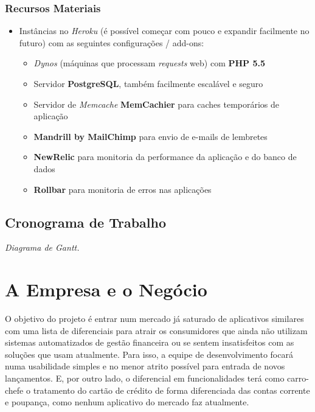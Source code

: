 \documentclass[a4paper]{abnt}
\begin{document}
\subsection*{Recursos Materiais}
\begin{itemize}
	\item Instâncias no \emph{Heroku} (é possível começar com pouco e expandir facilmente no futuro\cite{heroku}) com as seguintes configurações / add-ons:
	\begin{itemize}
		\item \emph{Dynos} (máquinas que processam \emph{requests} web) com \textbf{PHP 5.5}
		\item Servidor \textbf{PostgreSQL}, também facilmente escalável e seguro\cite{heroku-pgsql}
		\item Servidor de \emph{Memcache} \textbf{MemCachier} para caches temporários de aplicação
		\item \textbf{Mandrill by MailChimp} para envio de e-mails de lembretes
		\item \textbf{NewRelic} para monitoria da performance da aplicação e do banco de dados
		\item \textbf{Rollbar} para monitoria de erros nas aplicações
	\end{itemize}
\end{itemize}

\section{Cronograma de Trabalho}
\emph{Diagrama de Gantt.}

\chapter{A Empresa e o Negócio}
O objetivo do projeto é entrar num mercado já saturado de aplicativos similares com uma lista de diferenciais para atrair os consumidores que ainda não utilizam sistemas automatizados de gestão financeira ou se sentem insatisfeitos com as soluções que usam atualmente. Para isso, a equipe de desenvolvimento focará numa usabilidade simples e no menor atrito possível para entrada de novos lançamentos. E, por outro lado, o diferencial em funcionalidades terá como carro-chefe o tratamento do cartão de crédito de forma diferenciada das contas corrente e poupança, como nenhum aplicativo do mercado faz atualmente.
\end{document}
